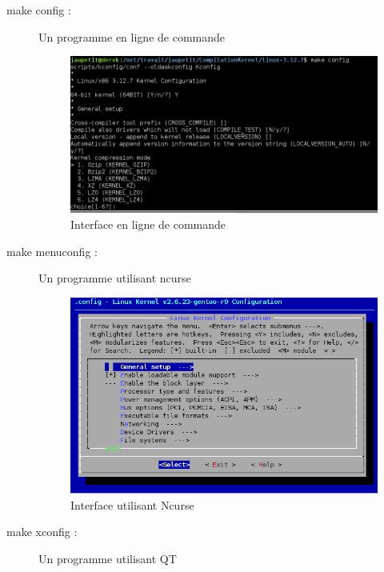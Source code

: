 ﻿\documentclass[17pts]{report}
\begin{document}
\begin{description}
\item[make config :]              Un programme en ligne de commande \\
        \begin{figure}[H]
            \includegraphics[scale=0.7]{illustrations/configLine.png}
            \centering
            \caption{Interface en ligne de commande}
            \label{fig:MakeConfig}
        \end{figure}
        \pagebreak
    \item[make menuconfig :]      Un programme utilisant ncurse \\
        \begin{figure}[H]
            \includegraphics[scale=0.7]{illustrations/menuconfig.png}
            \centering
            \caption{Interface utilisant Ncurse}
            \label{fig:MakeMenuConfig}
        \end{figure}
\item[make xconfig :]             Un programme utilisant QT \\

\end{description}
\end{document}
